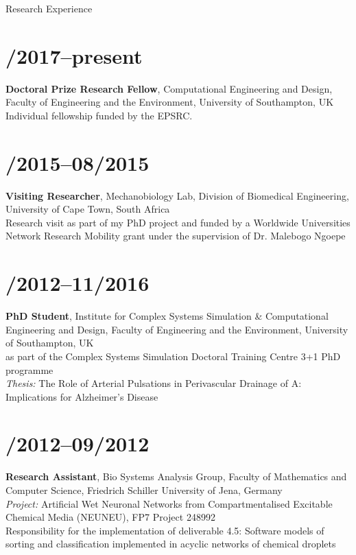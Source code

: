\documentclass[margin,line,10pt]{res}
\begin{document}
\begin{resume}
\vspace*{-.2in}

{\sc Research Experience}\\
\vspace*{-.35in}
\section{/2017--present}{\bf Doctoral Prize Research Fellow}, Computational Engineering and Design, Faculty of Engineering and the Environment, University of Southampton, UK\\
Individual fellowship funded by the EPSRC.\\
\vspace*{-.35in}
\section{/2015--08/2015}{\bf Visiting Researcher}, Mechanobiology Lab, Division of Biomedical Engineering, University of Cape Town, South Africa\\
Research visit as part of my PhD project and funded by a Worldwide Universities Network Research Mobility grant under the supervision of Dr. Malebogo Ngoepe\\
\vspace*{-.35in}
\section{/2012--11/2016}{\bf PhD Student}, Institute for Complex Systems Simulation \& Computational Engineering and Design, Faculty of Engineering and the Environment, University of Southampton, UK\\
as part of the Complex Systems Simulation Doctoral Training Centre 3+1 PhD programme\\
{\em Thesis:} The Role of Arterial Pulsations in Perivascular Drainage of A\textbeta: Implications for Alzheimer's Disease\\    
\vspace*{-.35in}        
\section{/2012--09/2012}{\bf Research Assistant}, Bio Systems Analysis Group, Faculty of Mathematics and Computer Science, Friedrich Schiller University of Jena, Germany\\
{\em Project:} Artificial Wet Neuronal Networks from Compartmentalised Excitable Chemical Media (NEUNEU), FP7 Project 248992\\
Responsibility for the implementation of deliverable 4.5: Software models of sorting and classification implemented in acyclic networks of chemical droplets\\
\vspace*{-.35in}

\end{resume}
\end{document}
